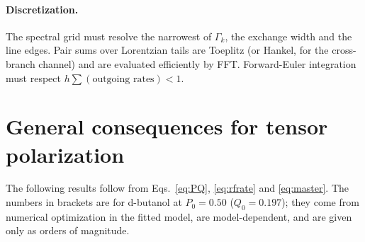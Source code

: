 \documentclass[11pt]{article}
\begin{document}
\paragraph{Discretization.} The spectral grid must resolve the narrowest of $\Gamma_k$, the
exchange width and the line edges. Pair sums over Lorentzian tails are Toeplitz (or Hankel, for
the cross-branch channel) and are evaluated efficiently by FFT. Forward-Euler integration must
respect $h\sum(\text{outgoing rates})<1$.

\section{General consequences for tensor polarization}
\label{sec:consequences}
The following results follow from Eqs.~\eqref{eq:PQ}, \eqref{eq:rfrate} and \eqref{eq:master}.
The numbers in brackets are for d-butanol at $P_0=0.50$ ($Q_0=0.197$); they come from numerical
optimization in the fitted model, are model-dependent, and are given only as orders of
magnitude.
\end{document}
